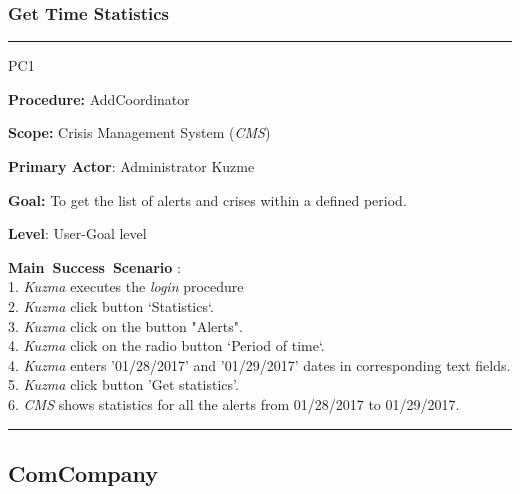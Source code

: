 \subsubsection{Get Time Statistics}
\vspace{0.5cm}
\hrule
\begin{lyxlist}{PC1}
\small{
\item [\textbf{Procedure:}] AddCoordinator
\item [\textbf{Scope:}] Crisis Management System (\emph{CMS})
\item [\textbf{Primary Actor}:] Administrator Kuzme
\item [\textbf{Goal:}] To get the list of alerts and crises within a defined
period.
\item [\textbf{Level}:] User-Goal level
\item [\textbf{Main~Success~Scenario}]:\\
1. \emph{Kuzma} executes the \emph{login} procedure\\
2. \emph{Kuzma} click button `Statistics`.\\
3. \emph{Kuzma} click on the button "Alerts".\\
4. \emph{Kuzma} click on the radio button `Period of time`.\\
4. \emph{Kuzma} enters '01/28/2017' and '01/29/2017' dates in corresponding text
fields.\\
5. \emph{Kuzma} click button 'Get statistics'. \\
6. \emph{CMS} shows statistics for all the alerts from 01/28/2017 to
01/29/2017.
}
\end{lyxlist}
\hrule
\vspace{0.5cm}

\subsection{ComCompany}

